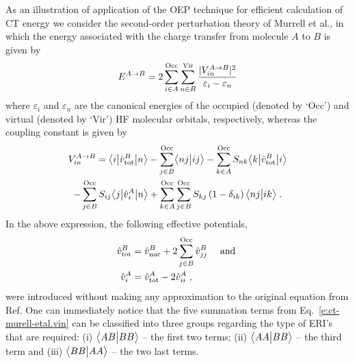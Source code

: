 As an illustration of application of the OEP technique for efficient calculation 
of CT energy we consider the second\hyp{}order perturbation theory of Murrell et al.,
in which the energy associated with the charge transfer from molecule $A$ to $B$ is given by
%
\begin{equation} \label{e:ct-murell-etal.e}
 E^{A\rightarrow B} = 2 \sum_{i\in A}^{\rm Occ} \sum_{n\in B}^{\rm Vir} 
  \frac{\vert V^{A\rightarrow B}_{in} \vert^2 }{\varepsilon_i - \varepsilon_n}
\end{equation}
%
%
where $\varepsilon_i$ and $\varepsilon_n$ are the canonical energies
of the occupied (denoted by `Occ') and virtual (denoted by `Vir') 
HF molecular orbitals, respectively,
whereas the coupling constant is given by
%
\begin{multline} \label{e:ct-murell-etal.vin}
 V^{A\rightarrow B}_{in} = 
        \bigl\langle {i} \bigl\lvert {\hat{v}^B_{\rm tot} } \bigl\lvert {n} \bigr\rangle 
      - \sum_{j\in B}^{\rm Occ} \bigl\langle {nj} \bigl\lvert {ij} \bigr\rangle 
      - \sum_{k\in A}^{\rm Occ} S_{nk} \bigl\langle {k} \bigl\lvert {\hat{v}^B_{\rm tot} } \bigl\lvert {i} \bigr\rangle \\
      - \sum_{j\in B}^{\rm Occ} S_{ij} \bigl\langle {j} \bigl\lvert {\hat{v}^A_{i} } \bigl\lvert {n} \bigr\rangle  
     + \sum_{k\in A}^{\rm Occ} \sum_{j\in B}^{\rm Occ}  
        S_{kj} \left( 1 - \delta_{ik} \right) 
        \bigl\langle {nj} \bigl\lvert {ik} \bigr\rangle \;.
\end{multline}
%
In the above expression, the following effective potentials,
%
\begin{subequations} 
\begin{align} \label{e:ct-murell-etal.vtot-vi}
 \hat{v}^B_{\rm tot} &= \hat{v}^B_{\rm nuc} + 2\sum_{j\in B}^{\rm Occ} \hat{v}^B_{jj} \quad\text{ and }\\ 
 \hat{v}^A_{i      } &= \hat{v}^A_{\rm tot} - 2\hat{v}^A_{ii} \;,
\end{align}
\end{subequations}
%
were introduced without making any approximation to the original equation
from Ref. One can immediately notice that the five summation terms
from Eq.~\eqref{e:ct-murell-etal.vin} can be classified into three groups
regarding the type of ERI's that are required:
(i) $\bigl\langle {AB} \bigl\lvert {BB} \bigr\rangle$ -- the first two terms;
(ii) $\bigl\langle {AA} \bigl\lvert {BB} \bigr\rangle$ -- the third term and
(iii) $\bigl\langle {BB} \bigl\lvert {AA} \bigr\rangle$ -- the two last terms. 

